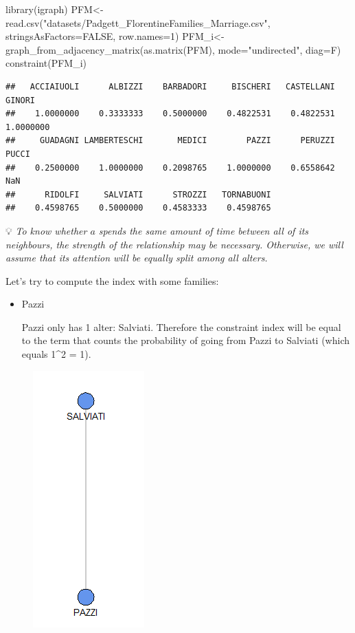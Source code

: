 \documentclass[
  notitlepage,
  onecolumn,
  openany]{book}
\newenvironment{Shaded}{\begin{snugshade}}{\end{snugshade}}
\newcommand{\AttributeTok}[1]{\textcolor[rgb]{0.77,0.63,0.00}{#1}}
\newcommand{\ConstantTok}[1]{\textcolor[rgb]{0.00,0.00,0.00}{#1}}
\newcommand{\DecValTok}[1]{\textcolor[rgb]{0.00,0.00,0.81}{#1}}
\newcommand{\FunctionTok}[1]{\textcolor[rgb]{0.00,0.00,0.00}{#1}}
\newcommand{\NormalTok}[1]{#1}
\newcommand{\OtherTok}[1]{\textcolor[rgb]{0.56,0.35,0.01}{#1}}
\newcommand{\StringTok}[1]{\textcolor[rgb]{0.31,0.60,0.02}{#1}}
\begin{document}
\begin{Shaded}
\begin{Highlighting}[]
\FunctionTok{library}\NormalTok{(igraph)}
\NormalTok{PFM}\OtherTok{\textless{}{-}}\FunctionTok{read.csv}\NormalTok{(}\StringTok{"datasets/Padgett\_FlorentineFamilies\_Marriage.csv"}\NormalTok{,}
                            \AttributeTok{stringsAsFactors=}\ConstantTok{FALSE}\NormalTok{,}
                            \AttributeTok{row.names=}\DecValTok{1}\NormalTok{)}
\NormalTok{PFM\_i}\OtherTok{\textless{}{-}}\FunctionTok{graph\_from\_adjacency\_matrix}\NormalTok{(}\FunctionTok{as.matrix}\NormalTok{(PFM),}
                                   \AttributeTok{mode=}\StringTok{"undirected"}\NormalTok{,}
                                   \AttributeTok{diag=}\NormalTok{F)}
\FunctionTok{constraint}\NormalTok{(PFM\_i)}
\end{Highlighting}
\end{Shaded}

\begin{verbatim}
##   ACCIAIUOLI      ALBIZZI    BARBADORI     BISCHERI   CASTELLANI       GINORI 
##    1.0000000    0.3333333    0.5000000    0.4822531    0.4822531    1.0000000 
##     GUADAGNI LAMBERTESCHI       MEDICI        PAZZI      PERUZZI        PUCCI 
##    0.2500000    1.0000000    0.2098765    1.0000000    0.6558642          NaN 
##      RIDOLFI     SALVIATI      STROZZI   TORNABUONI 
##    0.4598765    0.5000000    0.4583333    0.4598765
\end{verbatim}

💡 \emph{To know whether \(a\) spends the same amount of time between all of its neighbours, the strength of the relationship may be necessary. Otherwise, we will assume that its attention will be equally split among all alters.}

Let's try to compute the index with some families:

\begin{itemize}
\item
  Pazzi

  Pazzi only has 1 alter: Salviati. Therefore the constraint index will be equal to the term that counts the probability of going from Pazzi to Salviati (which equals 1\^{}2 = 1).
\end{itemize}

\begin{figure}[h!]

{\centering \includegraphics[width=0.2\linewidth]{images/08-Metrics for structural holes/Untitled 4} 

}

\end{figure}
\end{document}

